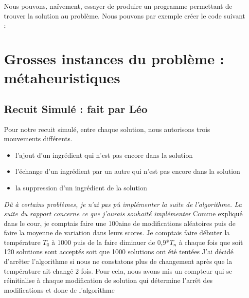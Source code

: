 \documentclass{article}
\begin{document}
Nous pouvons, naïvement, essayer de produire un programme permettant de trouver la solution au problème.\newline
Nous pouvons par exemple créer le code suivant : 


\section{Grosses instances du problème : métaheuristiques}
\subsection{Recuit Simulé : fait par Léo}
    Pour notre recuit simulé, entre chaque solution, nous autorisons trois mouvements différents. 
    \begin{itemize}
        \item l'ajout d'un ingrédient qui n'est pas encore dans la solution
        \item l'échange d'un ingrédient par un autre qui n'est pas encore dans la solution
        \item la suppression d'un ingrédient de la solution
    \end{itemize}
    \textit{Dû à certains problèmes, je n'ai pas pû implémenter la suite de l'algorithme. La suite du rapport concerne ce que j'aurais souhaité implémenter}\newline
    Comme expliqué dans le cour, je comptais faire une 100aine de modifications aléatoires puis de faire la moyenne de variation dans leurs scores.
    Je comptais faire débuter la température $T_0$ à 1000 puis de la faire diminuer de 0,9*$T_n$ à chaque fois que soit 120 solutions sont acceptés soit que 1000 solutions ont été tentées
    J'ai décidé d'arrêter l'algorithme si nous ne constatons plus de changement après que la température ait changé 2 fois.
    Pour cela, nous avons mis un compteur qui se réinitialise à chaque modification de solution qui détermine l'arrêt des modifications et donc de l'algorithme
\end{document}
